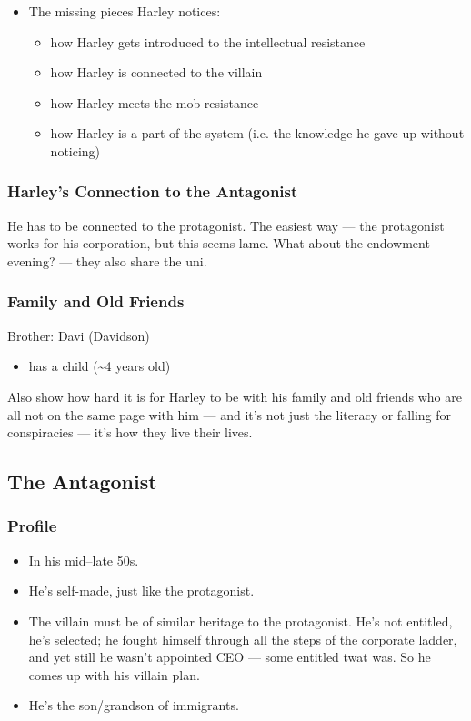 \documentclass[12pt]{article}
\begin{document}
\begin{itemize}
  \item[\(\checkmark\)] The missing pieces Harley notices:
  \begin{itemize}
    \item how Harley gets introduced to the intellectual resistance
    \item how Harley is connected to the villain
    \item how Harley meets the mob resistance
    \item how Harley is a part of the system (i.e. the knowledge he gave up without noticing)
  \end{itemize}
\end{itemize}

\subsubsection{Harley’s Connection to the Antagonist}

He has to be connected to the protagonist. The easiest way — the protagonist works for his corporation, but this seems lame. What about the endowment evening? — they also share the uni.

\subsubsection{Family and Old Friends}

Brother: Davi (Davidson)
\begin{itemize}
  \item has a child (\textasciitilde{}4 years old)
\end{itemize}

Also show how hard it is for Harley to be with his family and old friends who are all not on the same page with him — and it’s not just the literacy or falling for conspiracies — it’s how they live their lives.

\subsection{The Antagonist}

\subsubsection{Profile}

\begin{itemize}
  \item In his mid–late 50s.
  \item He’s self-made, just like the protagonist.
  \item The villain must be of similar heritage to the protagonist. He’s not entitled, he’s selected; he fought himself through all the steps of the corporate ladder, and yet still he wasn’t appointed CEO — some entitled twat was. So he comes up with his villain plan.
  \item He’s the son/grandson of immigrants.
\end{itemize}
\end{document}
